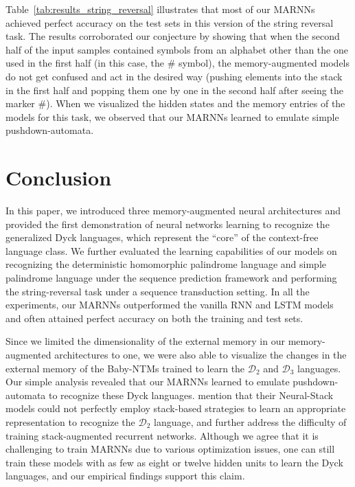 \documentclass[11pt,a4paper]{article}
\theoremstyle{plain}
\newcommand{\dyck}[1]{\ensuremath{\mathcal{D}_{#1}}}
\begin{document}
Table~\ref{tab:results_string_reversal} illustrates that most of our MARNNs achieved perfect accuracy on the test sets in this version of the string reversal task. The results corroborated our conjecture by showing that when the second half of the input samples contained symbols from an alphabet other than the one used in the first half (in this case, the $\#$ symbol), the memory-augmented models do not get confused and act in the desired way (pushing elements into the stack in the first half and popping them one by one in the second half after seeing the marker $\#$). When we visualized the hidden states and the memory entries of the models for this task, we observed that our MARNNs learned to emulate simple pushdown-automata.

\section{Conclusion}
In this paper, we introduced three memory-augmented neural architectures and provided the first demonstration of neural networks learning to recognize the generalized Dyck languages, which represent the ``core'' of the context-free language class. We further evaluated the learning capabilities of our models on recognizing the deterministic homomorphic palindrome language and simple palindrome language under the sequence prediction framework and performing the string-reversal task under a sequence transduction setting. In all the experiments, our MARNNs outperformed the vanilla RNN and LSTM models and often attained perfect accuracy on both the training and test sets. 

Since we limited the dimensionality of the external memory in our memory-augmented architectures to one, we were also able to visualize the changes in the external memory of the Baby-NTMs trained to learn the \dyck{2} and \dyck{3} languages. Our simple analysis revealed that our MARNNs learned to emulate pushdown-automata to recognize these Dyck languages. \citet{hao2018context} mention that their Neural-Stack models could not perfectly employ stack-based strategies to learn an appropriate representation to recognize the \dyck{2} language, and further address the difficulty of training stack-augmented recurrent networks. Although we agree that it is challenging to train MARNNs due to various optimization issues, one can still train these models with as few as eight or twelve hidden units to learn the Dyck languages, and our empirical findings support this claim. 
\end{document}
